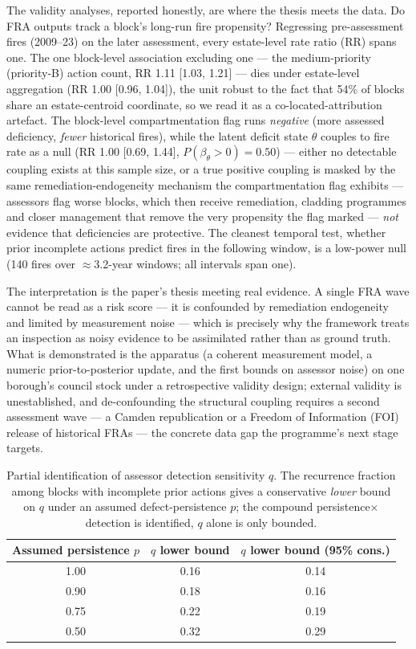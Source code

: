 The validity analyses, reported honestly, are where the thesis meets the data. Do FRA
outputs track a block's long-run fire propensity? Regressing pre-assessment fires
(2009--23) on the later assessment, every estate-level rate ratio (RR) spans one. The
one block-level association excluding one --- the medium-priority (priority-B) action
count, RR 1.11 [1.03, 1.21] --- dies under estate-level aggregation (RR 1.00
[0.96, 1.04]), the unit robust to the fact that 54\% of blocks share an estate-centroid
coordinate, so we read it as a co-located-attribution artefact. The block-level compartmentation flag runs
\emph{negative} (more assessed deficiency, \emph{fewer} historical fires), while the
latent deficit state $\theta$ couples to fire rate as a null (RR 1.00 [0.69, 1.44],
$P(\beta_\theta>0)=0.50$) --- either no detectable coupling exists at this sample
size, or a true positive coupling is masked by the same
remediation-endogeneity mechanism the compartmentation flag exhibits --- assessors flag worse blocks, which then receive
remediation, cladding programmes and closer management that remove the very propensity
the flag marked --- \emph{not} evidence that deficiencies are protective. The cleanest
temporal test, whether prior incomplete actions predict fires in the following window,
is a low-power null (140 fires over $\approx$3.2-year windows; all intervals span one).

The interpretation is the paper's thesis meeting real evidence. A single FRA wave
cannot be read as a risk score --- it is confounded by remediation endogeneity and
limited by measurement noise --- which is precisely why the framework treats an
inspection as noisy evidence to be assimilated rather than as ground truth. What is
demonstrated is the apparatus (a coherent measurement model, a numeric
prior-to-posterior update, and the first bounds on assessor noise) on one borough's
council stock under a retrospective validity design; external validity is
unestablished, and de-confounding the structural coupling requires a second assessment
wave --- a Camden republication or a Freedom of Information (FOI) release of historical
FRAs --- the concrete data gap the programme's next stage targets.

\begin{table}[htbp]
  \centering
  \caption{Partial identification of assessor detection sensitivity $q$. The
  recurrence fraction among blocks with incomplete prior actions gives a conservative
  \emph{lower} bound on $q$ under an assumed defect-persistence $p$; the compound
  persistence$\times$detection is identified, $q$ alone is only bounded.}
  \label{tab:bounds}
  \small
  \begin{tabular}{@{}ccc@{}}
    \toprule
    Assumed persistence $p$ & $q$ lower bound & $q$ lower bound (95\% cons.) \\
    \midrule
    1.00 & 0.16 & 0.14 \\
    0.90 & 0.18 & 0.16 \\
    0.75 & 0.22 & 0.19 \\
    0.50 & 0.32 & 0.29 \\
    \bottomrule
  \end{tabular}
\end{table}

